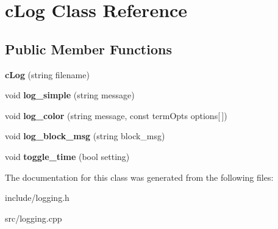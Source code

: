 \hypertarget{classcLog}{\section{c\-Log \-Class \-Reference}
\label{d9/d47/classcLog}
}
\subsection*{\-Public \-Member \-Functions}
\begin{DoxyCompactItemize}
\item 
\hypertarget{classcLog_a7e87269960564d10330a177edd1d2050}{{\bfseries c\-Log} (string filename)}\label{d9/d47/classcLog_a7e87269960564d10330a177edd1d2050}

\item 
\hypertarget{classcLog_a49f4252b9052482227bf3a7392c3bbec}{void {\bfseries log\-\_\-simple} (string message)}\label{d9/d47/classcLog_a49f4252b9052482227bf3a7392c3bbec}

\item 
\hypertarget{classcLog_a61e765767ed99591a411a0b1d9de8b9f}{void {\bfseries log\-\_\-color} (string message, const term\-Opts options\mbox{[}$\,$\mbox{]})}\label{d9/d47/classcLog_a61e765767ed99591a411a0b1d9de8b9f}

\item 
\hypertarget{classcLog_a63a0f720e95812a8176c6636001e3e79}{void {\bfseries log\-\_\-block\-\_\-msg} (string block\-\_\-msg)}\label{d9/d47/classcLog_a63a0f720e95812a8176c6636001e3e79}

\item 
\hypertarget{classcLog_a68a0fcfdb189284028f6fec5d437ae8c}{void {\bfseries toggle\-\_\-time} (bool setting)}\label{d9/d47/classcLog_a68a0fcfdb189284028f6fec5d437ae8c}

\end{DoxyCompactItemize}


\-The documentation for this class was generated from the following files\-:\begin{DoxyCompactItemize}
\item 
include/logging.\-h\item 
src/logging.\-cpp\end{DoxyCompactItemize}
